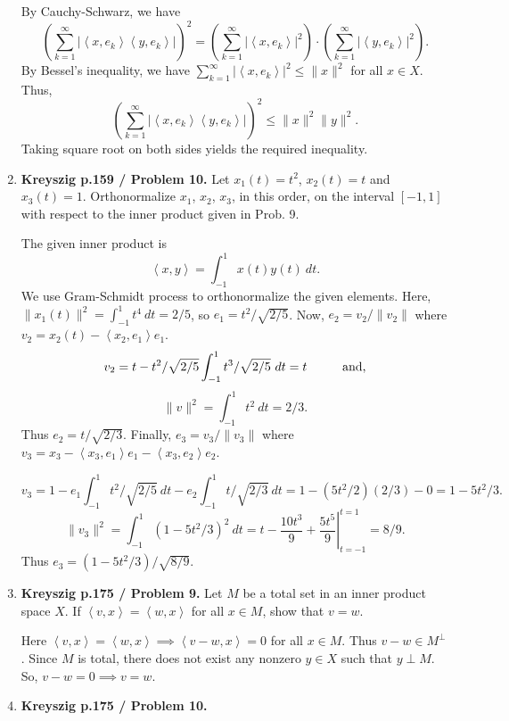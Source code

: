 \documentclass[12pt]{article}
\newcommand{\inn}[2]{\left\langle #1, #2 \right\rangle}
\begin{document}
\begin{enumerate}
\begin{mybox}
    By Cauchy-Schwarz, we have
    $$\left(\sum_{k=1}^\infty{|\inn{x}{e_k}\inn{y}{e_k}|}
    \right)^2
    =\left(\sum_{k=1}^\infty{|\inn{x}{e_k}|^2}\right)\cdot
    \left(\sum_{k=1}^\infty{|\inn{y}{e_k}|^2}\right).$$
    By Bessel's inequality, we have $\sum_{k=1}^\infty
    {|\inn{x}{e_k}|^2}\leq\|x\|^2$ for all $x\in X$.
    Thus, 
    $$\left(\sum_{k=1}^\infty{|\inn{x}{e_k}\inn{y}{e_k}|}
    \right)^2\leq \|x\|^2\|y\|^2.$$
    Taking square root on both sides yields the required
    inequality.
\end{mybox}


\item \textbf{Kreyszig p.159 / Problem 10.}
Let $x_1(t) =t^2$, $x_2(t) =t$ and $x_3(t) =1$.
Orthonormalize $x_1$, $x_2$, $x_3$, in this order,
on the interval $[-1, 1]$ with respect to the inner
product given in Prob. 9.
\begin{mybox}

    The given inner product is
    $$\inn{x}{y}=\int_{-1}^1{x(t)y(t)\ dt}.$$
    We use Gram-Schmidt process to orthonormalize the
    given elements.
    Here, $\|x_1(t)\|^2=\int_{-1}^1{t^4\ dt}=2/5$, so
    $e_1=t^2/\sqrt{2/5}$. Now,
    $e_2=v_2/\|v_2\|$ where $v_2=x_2(t)-\inn{x_2}{e_1}e_1$.
    $$v_2=t-t^2/\sqrt{2/5}\int_{-1}^1{t^3/\sqrt{2/5}\ dt}
    =t \hspace*{10mm} \text{and,}$$
    $$\|v\|^2=\int_{-1}^1{t^2\ dt}=2/3.$$
    Thus $e_2=t/\sqrt{2/3}$. Finally, $e_3=v_3/\|v_3\|$
    where $v_3=x_3-\inn{x_3}{e_1}e_1-\inn{x_3}{e_2}e_2$.

    $$v_3=1-e_1\int_{-1}^1{t^2/\sqrt{2/5}\ dt}-
    e_2\int_{-1}^1{t/\sqrt{2/3}\ dt}=1-(5t^2/2)(2/3)-0
    =1-5t^2/3.$$
    $$\|v_3\|^2=\int_{-1}^1{(1-5t^2/3)^2\ dt}
    = \left. t-\frac{10t^3}{9}+\frac{5t^5}{9}\right|
    _{t=-1}^{t=1}=8/9.$$
    Thus $e_3=(1-5t^2/3)/\sqrt{8/9}$.
\end{mybox}

 
\item \textbf{Kreyszig p.175 / Problem 9.}
Let $M$ be a total set in an inner product space $X$.
If $\inn{v}{x}=\inn{w}{x}$ for all $x\in M$,
show that $v = w$.
\begin{mybox}

    Here $\inn{v}{x}=\inn{w}{x}\implies
    \inn{v-w}{x}=0$ for all $x\in M$. Thus
    $v-w\in M^\perp$. Since $M$ is total,
    there does not exist any nonzero $y\in X$ such that
    $y\perp M$.
    So, $v-w=0\implies v=w$.
\end{mybox}
 
\item \textbf{Kreyszig p.175 / Problem 10.}


\end{enumerate}
\end{document}
